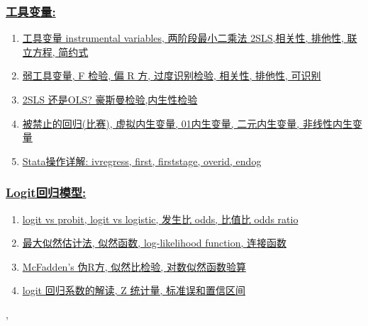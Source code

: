 \documentclass[11pt]{article}
\renewcommand{\today}{\shortmonthname[\the\month] \the \day,  \the\year}
\begin{document}
\subsubsection*{\href{https://space.bilibili.com/421438815/lists/1043569?type=season}{\kaishu 工具变量:}}

\vspace{-0.25cm}

\begin{enumerate}
	\item \href{https://mp.weixin.qq.com/s/ZT9hly47Fa3-Ag8YiwjS1A}{工具变量 instrumental variables, 两阶段最小二乘法 2SLS,相关性, 排他性, 联立方程, 简约式}
	\item \href{https://mp.weixin.qq.com/s/iMTV2k1a_cnAFDHwz8b04Q}{弱工具变量, F 检验, 偏 R 方, 过度识别检验, 相关性, 排他性, 可识别}
	\item \href{https://mp.weixin.qq.com/s/c0IGE8_P0R_E0BrJd9_GRw}{2SLS 还是OLS? 豪斯曼检验,内生性检验}
	\item \href{https://mp.weixin.qq.com/s/ymBux95BhKxKsXMrj7dGpg}{被禁止的回归(比赛), 虚拟内生变量, 01内生变量, 二元内生变量, 非线性内生变量}
	\item \href{https://mp.weixin.qq.com/s/-Qtk2aBJajDju1zYjHyRcg}{Stata操作详解: ivregress, first, firststage, overid, endog}
\end{enumerate}


\subsubsection*{\href{https://space.bilibili.com/421438815/lists?sid=339394&spm_id_from=333.788.0.0}{\kaishu Logit回归模型:}}

\vspace{-0.25cm}

\begin{enumerate}
	\item \href{https://mp.weixin.qq.com/s/1pclvq5JJV-Xg5InK0hK5g}{logit vs probit, logit vs logistic, 发生比 odds, 比值比 odds ratio}
	\item \href{https://mp.weixin.qq.com/s/ehJ9mesEokfN2hIWNcJTHg}{最大似然估计法, 似然函数, log-likelihood function, 连接函数}
	\item \href{https://mp.weixin.qq.com/s/EtMHuAzlLjGxnX8G4IUTEQ}{McFadden's 伪R方, 似然比检验, 对数似然函数验算}
	\item \href{https://mp.weixin.qq.com/s/x32OBDqqvSABPAzCRcejOA}{logit 回归系数的解读, Z 统计量, 标准误和置信区间}
\end{enumerate}



%
\begin{flushright}
	\tiny \today 
\end{flushright}
\end{document}
